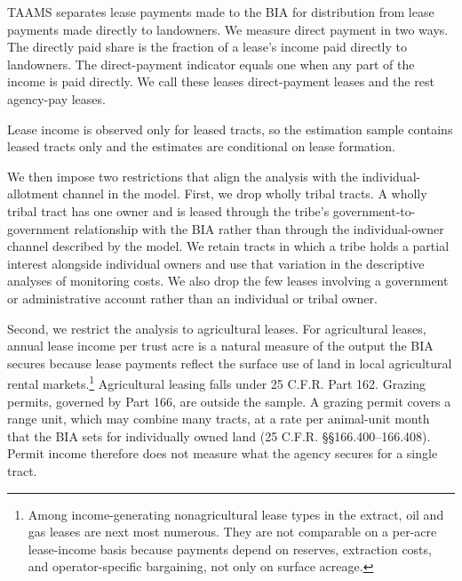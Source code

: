 \documentclass[12pt]{article}
\begin{document}
TAAMS separates lease payments made to the BIA for distribution from lease payments made directly to landowners. We measure direct payment in two ways. The directly paid share is the fraction of a lease's income paid directly to landowners. The direct-payment indicator equals one when any part of the income is paid directly. We call these leases direct-payment leases and the rest agency-pay leases.

Lease income is observed only for leased tracts, so the estimation sample contains leased tracts only and the estimates are conditional on lease formation.

We then impose two restrictions that align the analysis with the individual-allotment channel in the model. First, we drop wholly tribal tracts. A wholly tribal tract has one owner and is leased through the tribe's government-to-government relationship with the BIA rather than through the individual-owner channel described by the model. We retain tracts in which a tribe holds a partial interest alongside individual owners and use that variation in the descriptive analyses of monitoring costs. We also drop the few leases involving a government or administrative account rather than an individual or tribal owner.

Second, we restrict the analysis to agricultural leases. For agricultural leases, annual lease income per trust acre is a natural measure of the output the BIA secures because lease payments reflect the surface use of land in local agricultural rental markets.\footnote{Among income-generating nonagricultural lease types in the extract, oil and gas leases are next most numerous. They are not comparable on a per-acre lease-income basis because payments depend on reserves, extraction costs, and operator-specific bargaining, not only on surface acreage.} Agricultural leasing falls under 25 C.F.R. Part 162. Grazing permits, governed by Part 166, are outside the sample. A grazing permit covers a range unit, which may combine many tracts, at a rate per animal-unit month that the BIA sets for individually owned land (25 C.F.R. \S\S 166.400--166.408). Permit income therefore does not measure what the agency secures for a single tract.
\end{document}
